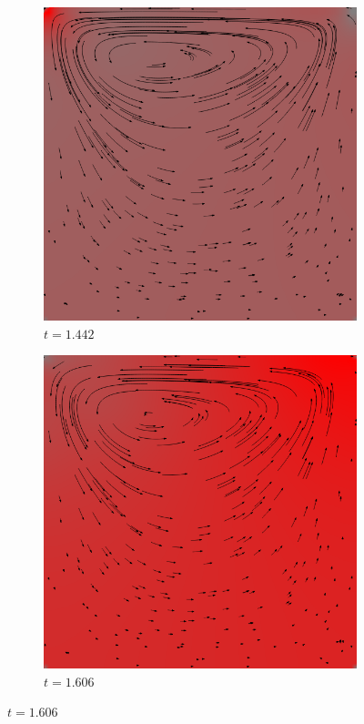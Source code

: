 		\begin{figure}[!htb]
			\centering
			\begin{subfigure}[b]{.5\textwidth}
				\includegraphics[scale = 0.28]{screenshots/periodic-01442.png}
				\caption{$t=1.442$}
			\end{subfigure}%
			\begin{subfigure}[b]{.5\textwidth}
				\includegraphics[scale = 0.28]{screenshots/periodic-01606.png}
				\caption{$t=1.606$}
			\end{subfigure}


\end{figure}
